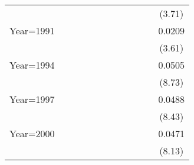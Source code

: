 \begin{table}[htbp]
\begin{tabular}{l*{11}{c}}
                    &                     &                     &                     &                     &                     &                     &                     &                     &                     &                     &      (3.71)         \\
[1em]
Year=1991           &                     &                     &                     &                     &                     &                     &                     &                     &                     &                     &      0.0209\sym{***}\\
                    &                     &                     &                     &                     &                     &                     &                     &                     &                     &                     &      (3.61)         \\
[1em]
Year=1994           &                     &                     &                     &                     &                     &                     &                     &                     &                     &                     &      0.0505\sym{***}\\
                    &                     &                     &                     &                     &                     &                     &                     &                     &                     &                     &      (8.73)         \\
[1em]
Year=1997           &                     &                     &                     &                     &                     &                     &                     &                     &                     &                     &      0.0488\sym{***}\\
                    &                     &                     &                     &                     &                     &                     &                     &                     &                     &                     &      (8.43)         \\
[1em]
Year=2000           &                     &                     &                     &                     &                     &                     &                     &                     &                     &                     &      0.0471\sym{***}\\
                    &                     &                     &                     &                     &                     &                     &                     &                     &                     &                     &      (8.13)         \\

\end{tabular}
\end{table}

